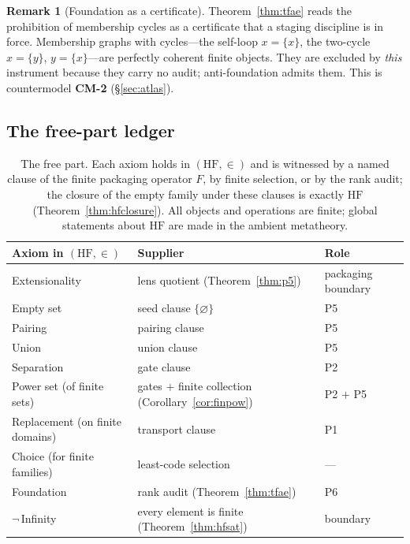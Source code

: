 \documentclass[11pt]{article}
\newcommand{\HF}{\mathrm{HF}}                 \newcommand{\rank}{\operatorname{rank}}
\theoremstyle{definition}
\newtheorem{remark}[theorem]{Remark}
\begin{document}
\begin{remark}[Foundation as a certificate]\label{rem:foundation}
Theorem~\ref{thm:tfae} reads the prohibition of membership cycles as a certificate that a
staging discipline is in force. Membership graphs with cycles---the self-loop $x=\{x\}$, the
two-cycle $x=\{y\}$, $y=\{x\}$---are perfectly coherent finite objects. They are excluded by
\emph{this} instrument because they carry no audit; anti-foundation \citep{Aczel1988} admits them.
This is countermodel \textbf{CM-2} (\S\ref{sec:atlas}).
\end{remark}

\subsection{The free-part ledger}

\begin{table}[tbp]\centering
\small
\begin{tabular}{@{}lll@{}}
\toprule
Axiom in $(\HF,\in)$ & Supplier & Role \\
\midrule
Extensionality & lens quotient (Theorem~\ref{thm:p5}) & packaging boundary \\
Empty set & seed clause $\{\varnothing\}$ & P5 \\
Pairing & pairing clause & P5 \\
Union & union clause & P5 \\
Separation & gate clause & P2 \\
Power set (of finite sets) & gates $+$ finite collection (Corollary~\ref{cor:finpow}) & P2 $+$ P5 \\
Replacement (on finite domains) & transport clause & P1 \\
Choice (for finite families) & least-code selection & --- \\
Foundation & rank audit (Theorem~\ref{thm:tfae}) & P6 \\
$\neg\,$Infinity & every element is finite (Theorem~\ref{thm:hfsat}) & boundary \\
\bottomrule
\end{tabular}
\caption{The free part. Each axiom holds in $(\HF,\in)$ and is witnessed by a named clause of the
finite packaging operator $F$, by finite selection, or by the rank audit; the closure of the
empty family under these clauses is exactly $\HF$ (Theorem~\ref{thm:hfclosure}). All objects and
operations are finite; global statements about $\HF$ are made in the ambient metatheory.}
\label{tab:freepart}
\end{table}
\end{document}
